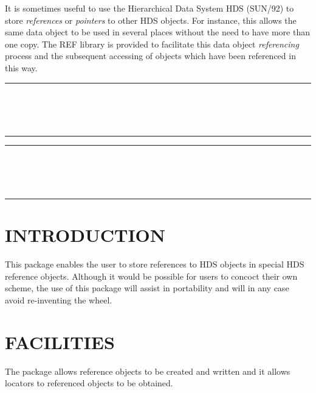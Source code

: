It is sometimes useful to use the Hierarchical Data System HDS (SUN/92) to
store {\em references } or {\em pointers} to other HDS objects. For instance,
this allows the same data object to be used in several places without the need
to have more than one copy. The REF library is provided to facilitate this data
object {\em referencing} process and the subsequent accessing of objects which
have been referenced in this way.

\newpage
\markright{\stardocname}
\null\vspace {5mm}
\begin {center}
\rule{80mm}{0.5mm} \\ [1ex]
{\Large\bf \stardoctitle \\ [2.5ex]
           \stardocversion} \\ [2ex]
\rule{80mm}{0.5mm}
\end{center}

\setlength{\parskip}{0mm}
\tableofcontents
\setlength{\parskip}{\medskipamount}

\newpage
\markright{\stardocname}
\renewcommand{\thepage}{\arabic{page}}
\setcounter{page}{1}

\null\vspace {5mm}
\begin {center}
\rule{80mm}{0.5mm} \\ [1ex]
{\Large\bf \stardoctitle \\ [2.5ex]
           \stardocversion} \\ [2ex]
\rule{80mm}{0.5mm}
\end{center}
\vspace{30mm}

\section{INTRODUCTION}
This package enables the user to store references to HDS objects in special HDS
reference objects.
Although it would be possible for users to concoct their own scheme, the use of
this package will assist in portability and will in any case avoid re-inventing
the wheel.

\section{FACILITIES}

The package allows reference objects to be created and written and it allows
locators to referenced objects to be obtained.

